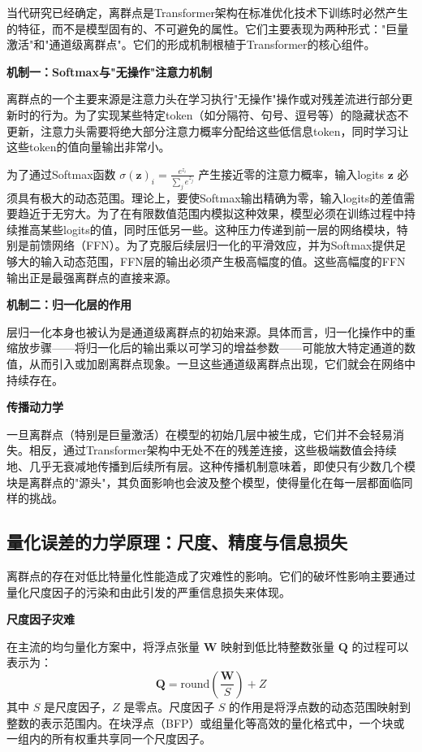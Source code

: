 \documentclass[letterpaper,twocolumn,10pt]{article}
\begin{document}
当代研究已经确定，离群点是Transformer架构在标准优化技术下训练时必然产生的特征，而不是模型固有的、不可避免的属性。它们主要表现为两种形式："巨量激活"和"通道级离群点"。它们的形成机制根植于Transformer的核心组件。

\textbf{机制一：Softmax与"无操作"注意力机制}

离群点的一个主要来源是注意力头在学习执行"无操作"操作或对残差流进行部分更新时的行为。为了实现某些特定token（如分隔符、句号、逗号等）的隐藏状态不更新，注意力头需要将绝大部分注意力概率分配给这些低信息token，同时学习让这些token的值向量输出非常小。

为了通过Softmax函数 $\sigma(\mathbf{z})_i = \frac{e^{z_i}}{\sum_j e^{z_j}}$ 产生接近零的注意力概率，输入logits $\mathbf{z}$ 必须具有极大的动态范围。理论上，要使Softmax输出精确为零，输入logits的差值需要趋近于无穷大。为了在有限数值范围内模拟这种效果，模型必须在训练过程中持续推高某些logits的值，同时压低另一些。这种压力传递到前一层的网络模块，特别是前馈网络（FFN）。为了克服后续层归一化的平滑效应，并为Softmax提供足够大的输入动态范围，FFN层的输出必须产生极高幅度的值。这些高幅度的FFN输出正是最强离群点的直接来源。

\textbf{机制二：归一化层的作用}

层归一化本身也被认为是通道级离群点的初始来源。具体而言，归一化操作中的重缩放步骤——将归一化后的输出乘以可学习的增益参数——可能放大特定通道的数值，从而引入或加剧离群点现象。一旦这些通道级离群点出现，它们就会在网络中持续存在。

\textbf{传播动力学}

一旦离群点（特别是巨量激活）在模型的初始几层中被生成，它们并不会轻易消失。相反，通过Transformer架构中无处不在的残差连接，这些极端数值会持续地、几乎无衰减地传播到后续所有层。这种传播机制意味着，即使只有少数几个模块是离群点的"源头"，其负面影响也会波及整个模型，使得量化在每一层都面临同样的挑战。

\subsection{量化误差的力学原理：尺度、精度与信息损失}

离群点的存在对低比特量化性能造成了灾难性的影响。它们的破坏性影响主要通过量化尺度因子的污染和由此引发的严重信息损失来体现。

\textbf{尺度因子灾难}

在主流的均匀量化方案中，将浮点张量 $\mathbf{W}$ 映射到低比特整数张量 $\mathbf{Q}$ 的过程可以表示为：
$$\mathbf{Q} = \text{round}(\frac{\mathbf{W}}{S}) + Z$$
其中 $S$ 是尺度因子，$Z$ 是零点。尺度因子 $S$ 的作用是将浮点数的动态范围映射到整数的表示范围内。在块浮点（BFP）或组量化等高效的量化格式中，一个块或一组内的所有权重共享同一个尺度因子。
\end{document}
